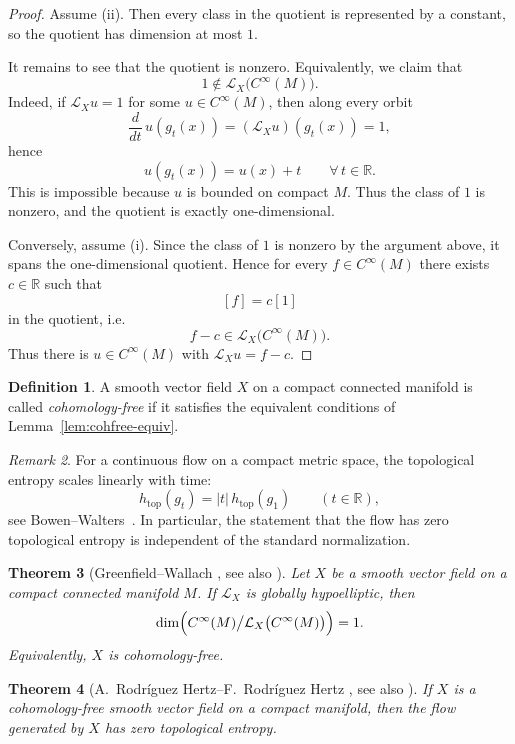 \documentclass[11pt]{article}
\newtheorem{theorem}{Theorem}
\theoremstyle{definition}
\newtheorem{definition}[theorem]{Definition}
\theoremstyle{remark}
\newtheorem{remark}[theorem]{Remark}
\begin{document}
\begin{proof}
Assume (ii). Then every class in the quotient is represented by a constant, so the quotient has dimension at most $1$.

It remains to see that the quotient is nonzero. Equivalently, we claim that
\[
1\notin \mathcal L_X\bigl(C^\infty(M)\bigr).
\]
Indeed, if $\mathcal L_Xu=1$ for some $u\in C^\infty(M)$, then along every orbit
\[
\frac{d}{dt}\,u(g_t(x)) = (\mathcal L_Xu)(g_t(x)) = 1,
\]
hence
\[
u(g_t(x)) = u(x)+t \qquad \forall\, t\in\mathbb R.
\]
This is impossible because $u$ is bounded on compact $M$. Thus the class of $1$ is nonzero, and the quotient is exactly one-dimensional.

Conversely, assume (i). Since the class of $1$ is nonzero by the argument above, it spans the one-dimensional quotient. Hence for every $f\in C^\infty(M)$ there exists $c\in\mathbb R$ such that
\[
[f]=c[1]
\]
in the quotient, i.e.
\[
f-c \in \mathcal L_X\bigl(C^\infty(M)\bigr).
\]
Thus there is $u\in C^\infty(M)$ with $\mathcal L_Xu=f-c$.
\end{proof}

\begin{definition}
A smooth vector field $X$ on a compact connected manifold is called \emph{cohomology-free} if it satisfies the equivalent conditions of Lemma~\ref{lem:cohfree-equiv}.
\end{definition}

\begin{remark}\label{rem:entropy-normalization}
For a continuous flow on a compact metric space, the topological entropy scales linearly with time:
\[
h_{\mathrm{top}}(g_t)=|t|\,h_{\mathrm{top}}(g_1)
\qquad (t\in\mathbb R),
\]
see Bowen--Walters~\cite{BW}. In particular, the statement that the flow has zero topological entropy is independent of the standard normalization.
\end{remark}

\begin{theorem}[Greenfield--Wallach {\cite{GW}}, see also {\cite[\S 2]{Forni}}]
\label{thm:GW}
Let $X$ be a smooth vector field on a compact connected manifold $M$. If $\mathcal L_X$ is globally hypoelliptic, then
\[
\dim\Bigl(C^\infty(M)\big/\mathcal L_X\bigl(C^\infty(M)\bigr)\Bigr)=1.
\]
Equivalently, $X$ is cohomology-free.
\end{theorem}

\begin{theorem}[A.~Rodr\'iguez Hertz--F.~Rodr\'iguez Hertz {\cite{RRH}}, see also {\cite[\S 2]{Forni}}]
\label{thm:RRH}
If $X$ is a cohomology-free smooth vector field on a compact manifold, then the flow generated by $X$ has zero topological entropy.
\end{theorem}
\end{document}
